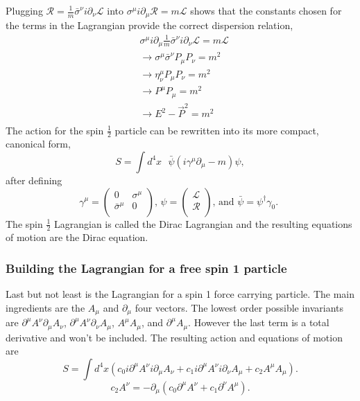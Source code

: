 \documentclass[12pt]{article}
\begin{document}
Plugging $\mathcal{R} = \frac{1}{m}\bar{\sigma}^\nu i\partial_\nu\mathcal{L}$ into $\sigma^\mu i\partial_\mu\mathcal{R} = m\mathcal{L}$ shows that the constants chosen for the terms in the Lagrangian provide the correct dispersion relation,
\begin{equation}
\begin{split}
&\sigma^\mu i\partial_\mu \frac{1}{m}\bar{\sigma}^\nu i\partial_\nu\mathcal{L} = m\mathcal{L} \\
&\rightarrow \sigma^\mu \bar{\sigma}^\nu P_\mu P_\nu = m^2 \\
&\rightarrow \eta^\mu_\nu P_\mu P_\nu = m^2 \\
&\rightarrow P^\mu P_\mu = m^2 \\
&\rightarrow E^2 - \vec{P}^2 = m^2 \\
\end{split}
\end{equation}
The action for the spin $\frac{1}{2}$ particle can be rewritten into its more compact, canonical form,
\begin{equation}
S = \int d^4x \text{ } \bar{\psi} \left(i\gamma^\mu\partial_\mu - m\right)\psi,
\end{equation} 
after defining
\begin{equation}
\gamma^\mu =
\begin{pmatrix}
0 & \sigma^\mu \\
\bar{\sigma}^\mu & 0 \\
\end{pmatrix}
\text{, } 
\psi =
\begin{pmatrix}
\mathcal{L} \\
\mathcal{R} \\
\end{pmatrix}
\text{, and } 
\bar{\psi} =
\psi^\dagger \gamma_0 \text{. }
\end{equation}
The spin $\frac{1}{2}$ Lagrangian is called the Dirac Lagrangian and the resulting equations of motion are the Dirac equation.

\subsubsection{Building the Lagrangian for a free spin 1 particle}
Last but not least is the Lagrangian for a spin 1 force carrying particle. The main ingredients are the $A_\mu$ and $\partial_\mu$ four vectors. The lowest order possible invariants are $\partial^\mu A^\nu\partial_\mu A_\nu$, $\partial^\mu A^\nu\partial_\nu A_\mu$, $A^\mu A_\mu$, and $\partial^\mu A_\mu$. However the last term is a total derivative and won't be included. The resulting action and equations of motion are 
\begin{equation}
S = \int d^4x \left( c_0 i\partial^\mu A^\nu i\partial_\mu A_\nu + c_1 i\partial^\mu A^\nu i\partial_\nu A_\mu + c_2 A^\mu A_\mu \right).
\end{equation}
\begin{equation}
c_2 A^\nu = -\partial_\mu\left(c_0 \partial^\mu A^\nu + c_1 \partial^\nu A^\mu\right).
\end{equation}
\end{document}

